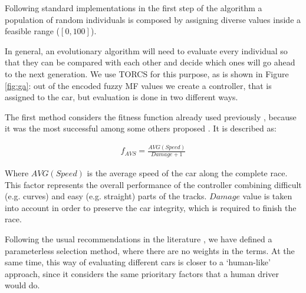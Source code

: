 \documentclass[10pt,journal,compsoc]{IEEEtran}
\begin{document}



Following standard implementations in the first step of the algorithm \cite{salem_evo18} a
population of random individuals is composed by assigning diverse values inside a feasible range ($[0,100]$).

In general, an evolutionary algorithm will need to evaluate every
individual so that they can be compared with each other and decide
which ones will go ahead to the next generation. We use TORCS for this
purpose, as is shown in Figure \ref{fig:ga}: out of the encoded fuzzy
MF values we create a controller, that is assigned to the car, but
evaluation is done in two different ways.

The first method considers the fitness function already used
previously \cite{salem_cig2018}, because it was the most successful 
among some others proposed \cite{salem_evo18}. It is described as: 

 \begin{equation} \label{fit_avg}
 	\begin{array}{lll}
 		f_{AVS}= \frac{AVG(Speed)}{Damage+1}
 	\end{array}
 \end{equation}	

Where $AVG(Speed)$ is the average speed of the car along the complete
race. This factor represents the overall performance of the controller
combining difficult (e.g. curves) and easy (e.g. straight) parts of
the tracks. $Damage$ value is taken into account in order to preserve
the car integrity, which is required to finish the race. 

Following the usual recommendations in the literature
\cite{Harik-ParameterLess99}, we have defined a parameterless
selection method, where there are no weights in the terms.
At the same time, this way of evaluating different cars is closer to a `human-like'
approach, since it considers the same prioritary factors that a human
driver would do.
\end{document}
